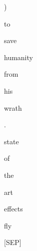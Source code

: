 \documentclass[varwidth=150mm]{standalone}
\begin{document}
\begin{CJK*}{UTF8}{gbsn}
{{{\colorbox{red!1.3130239248275757}{\strut )} \colorbox{red!3.0126025676727295}{\strut to} \colorbox{red!0.0}{\strut save} \colorbox{red!5.401333808898926}{\strut humanity} \colorbox{red!0.0}{\strut from} \colorbox{red!1.7257964611053467}{\strut his} \colorbox{red!0.0}{\strut wrath} \colorbox{red!7.323534965515137}{\strut .} \colorbox{red!14.932913780212402}{\strut state} \colorbox{red!1.5548810958862305}{\strut of} \colorbox{red!1.0473318099975586}{\strut the} \colorbox{red!3.492649793624878}{\strut art} \colorbox{red!12.158360481262207}{\strut effects} \colorbox{red!26.859230041503906}{\strut fly} \colorbox{red!3.283954620361328}{\strut [SEP]}
}}}
\end{CJK*}
\end{document}
